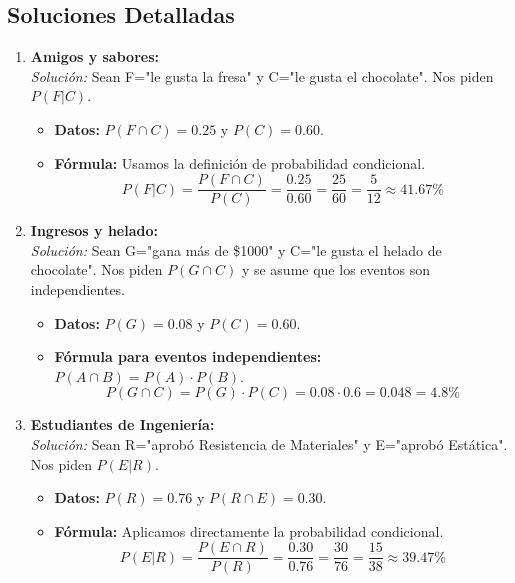 \documentclass[12pt, letterpaper]{article}
\begin{document}
\subsection{Soluciones Detalladas}
\begin{enumerate}
	\item \textbf{Amigos y sabores:} \\
	      \textit{Solución:} Sean F="le gusta la fresa" y C="le gusta el chocolate". Nos piden $P(F|C)$.
	      \begin{itemize}
		      \item \textbf{Datos:} $P(F \cap C) = 0.25$ y $P(C) = 0.60$.
		      \item \textbf{Fórmula:} Usamos la definición de probabilidad condicional.
		            \[ P(F|C) = \frac{P(F \cap C)}{P(C)} = \frac{0.25}{0.60} = \frac{25}{60} = \frac{5}{12} \approx 41.67\% \]
	      \end{itemize}

	\item \textbf{Ingresos y helado:} \\
	      \textit{Solución:} Sean G="gana más de \$1000" y C="le gusta el helado de chocolate". Nos piden $P(G \cap C)$ y se asume que los eventos son independientes.
	      \begin{itemize}
		      \item \textbf{Datos:} $P(G)=0.08$ y $P(C)=0.60$.
		      \item \textbf{Fórmula para eventos independientes:} $P(A \cap B) = P(A) \cdot P(B)$.
		            \[ P(G \cap C) = P(G) \cdot P(C) = 0.08 \cdot 0.6 = 0.048 = 4.8\% \]
	      \end{itemize}

	\item \textbf{Estudiantes de Ingeniería:} \\
	      \textit{Solución:} Sean R="aprobó Resistencia de Materiales" y E="aprobó Estática". Nos piden $P(E|R)$.
	      \begin{itemize}
		      \item \textbf{Datos:} $P(R)=0.76$ y $P(R \cap E) = 0.30$.
		      \item \textbf{Fórmula:} Aplicamos directamente la probabilidad condicional.
		            \[ P(E|R) = \frac{P(E \cap R)}{P(R)} = \frac{0.30}{0.76} = \frac{30}{76} = \frac{15}{38} \approx 39.47\% \]
	      \end{itemize}


\end{enumerate}
\end{document}
